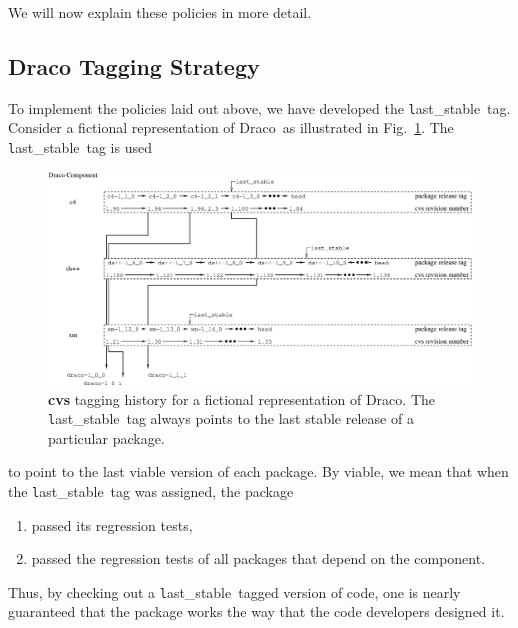 \documentclass[11pt]{nmemo}
\newcommand{\draco}{{\normalfont\normalsize\textsf Draco}}
\newcommand{\stable}{{\normalfont\normalsize\texttt last\_stable}}
\begin{document}
We will now explain these policies in more detail.

\subsection{Draco Tagging Strategy}
\label{sec:stable-tag}

To implement the policies laid out above, we have developed the
\stable\ tag.  Consider a fictional representation of \draco\ as
illustrated in Fig.~\ref{fig:tag-strategy}.  The \stable\ tag is used
\begin{figure}
  \centerline{\includegraphics[width=6.5in]{tag-strategy.eps}}
  \caption{{\bf cvs} tagging history for a fictional representation of 
    \draco.  The \stable\ tag always points to the last stable release 
    of a particular package.}
  \label{fig:tag-strategy}
\end{figure}
to point to the last viable version of each package.  By viable, we
mean that when the \stable\ tag was assigned, the package
\begin{enumerate}
\item passed its regression tests,
\item passed the regression tests of all packages that depend on the
  component.
\end{enumerate}
Thus, by checking out a \stable\ tagged version of code, one is
nearly guaranteed that the package works the way that the code
developers designed it.
\end{document}
